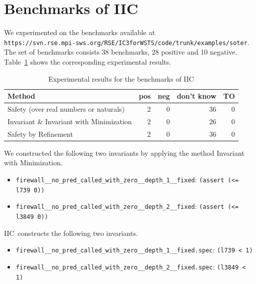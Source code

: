 \documentclass{article}
\newcommand{\iic}{{\sc IIC}}
\newcommand{\ttt}[1]{\texttt{#1}}
\begin{document}
\section{Benchmarks of \iic}

We experimented on the benchmarks available at \\
\ttt{https://svn.rse.mpi-sws.org/RSE/IC3forWSTS/code/trunk/examples/soter}.
The set of benchmarks consists 38 benchmarks, 28 positive and 10 negative.
Table~\ref{iic-experiments} shows the corresponding experimental results.

\begin{table}[h]
\begin{center}
  \begin{tabular}{ | p{6cm} | r | r | r | r | }
    \hline
    Method & pos & neg & don't know & TO \\
    \hline
    Safety (over real numbers or naturals)      & 2 & 0 & 36 & 0 \\
    Invariant \& Invariant with Minimization    & 2 & 0 & 26 & 0 \\
    Safety by Refinement                        & 2 & 0 & 36 & 0 \\
    \hline
  \end{tabular}
\end{center}
\caption{Experimental results for the benchmarks of \iic}
\label{iic-experiments}
\end{table}

We constructed the following two invariants by applying the method
Invariant with Minimization.

\begin{itemize}
\item \verb?firewall__no_pred_called_with_zero__depth_1__fixed?: \verb?(assert (<= l739 0))?
\item \verb?firewall__no_pred_called_with_zero__depth_2__fixed?: \verb?(assert (<= l3849 0))?
\end{itemize}

\iic\ constructs the following two invariants.

\begin{itemize}
\item \verb=firewall__no_pred_called_with_zero__depth_1__fixed.spec=: \verb=(l739 < 1)=
\item \verb=firewall__no_pred_called_with_zero__depth_2__fixed.spec=: \verb=(l3849 < 1)=
\end{itemize}

\fi
\end{document}
